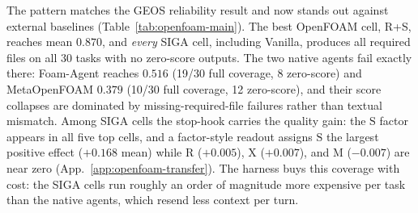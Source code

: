 \documentclass{article}
\begin{document}
The pattern matches the GEOS reliability result and now stands out against external baselines (Table~\ref{tab:openfoam-main}). The best OpenFOAM cell, R+S, reaches mean $0.870$, and \emph{every} SIGA cell, including Vanilla, produces all required files on all 30 tasks with no zero-score outputs. The two native agents fail exactly there: Foam-Agent reaches $0.516$ (19/30 full coverage, 8 zero-score) and MetaOpenFOAM $0.379$ (10/30 full coverage, 12 zero-score), and their score collapses are dominated by missing-required-file failures rather than textual mismatch. Among SIGA cells the stop-hook carries the quality gain: the $\mathrm{S}$ factor appears in all five top cells, and a factor-style readout assigns $\mathrm{S}$ the largest positive effect ($+0.168$ mean) while $\mathrm{R}$ ($+0.005$), $\mathrm{X}$ ($+0.007$), and $\mathrm{M}$ ($-0.007$) are near zero (App.~\ref{app:openfoam-transfer}). The harness buys this coverage with cost: the SIGA cells run roughly an order of magnitude more expensive per task than the native agents, which resend less context per turn.
\end{document}
